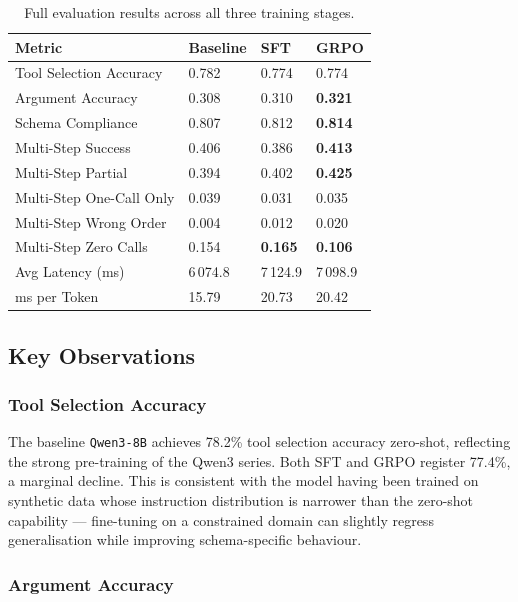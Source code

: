 \documentclass[12pt, a4paper]{article}
\newcommand{\thead}[1]{\textbf{#1}}
\begin{document}
\begin{table}[H]
\centering
\caption{Full evaluation results across all three training stages.}
\begin{tabularx}{\linewidth}{L{5.5cm} C{2.5cm} C{2.5cm} C{3.7cm}}
\toprule
\thead{Metric} & \thead{Baseline} & \thead{SFT} & \thead{GRPO} \\
\midrule
Tool Selection Accuracy       & 0.782 & 0.774 & 0.774 \\
Argument Accuracy             & 0.308 & 0.310 & \textbf{0.321} \\
Schema Compliance             & 0.807 & 0.812 & \textbf{0.814} \\
Multi-Step Success            & 0.406 & 0.386 & \textbf{0.413} \\
Multi-Step Partial            & 0.394 & 0.402 & \textbf{0.425} \\
Multi-Step One-Call Only      & 0.039 & 0.031 & 0.035 \\
Multi-Step Wrong Order        & 0.004 & 0.012 & 0.020 \\
Multi-Step Zero Calls         & 0.154 & \textbf{0.165} & \textbf{0.106} \\
Avg Latency (ms)              & 6\,074.8 & 7\,124.9 & 7\,098.9 \\
ms per Token                  & 15.79 & 20.73 & 20.42 \\
\bottomrule
\end{tabularx}
\end{table}

\subsection{Key Observations}

\subsubsection{Tool Selection Accuracy}

The baseline \texttt{Qwen3-8B} achieves 78.2\% tool selection accuracy
zero-shot, reflecting the strong pre-training of the Qwen3 series. Both SFT and
GRPO register 77.4\%, a marginal decline. This is consistent with the model
having been trained on synthetic data whose instruction distribution is narrower
than the zero-shot capability --- fine-tuning on a constrained domain can
slightly regress generalisation while improving schema-specific behaviour.

\subsubsection{Argument Accuracy}
\end{document}
